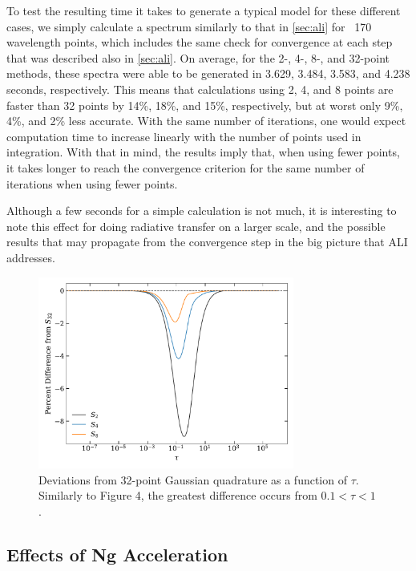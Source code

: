 \documentclass[12pt]{article}
\begin{document}
To test the resulting time it takes to generate a typical model for these different cases, we simply calculate a spectrum similarly to that in \autoref{sec:ali} for ~170 wavelength points, which includes the same check for convergence at each step that was described also in \autoref{sec:ali}. On average, for the 2-, 4-, 8-, and 32-point methods, these spectra were able to be generated in 3.629, 3.484, 3.583, and 4.238 seconds, respectively. This means that calculations using 2, 4, and 8 points are faster than 32 points by 14\%, 18\%, and 15\%, respectively, but at worst only 9\%, 4\%, and 2\% less accurate. With the same number of iterations, one would expect computation time to increase linearly with the number of points used in integration. With that in mind, the results imply that, when using fewer points, it takes longer to reach the convergence criterion for the same number of iterations when using fewer points.

Although a few seconds for a simple calculation is not much, it is interesting to note this effect for doing radiative transfer on a larger scale, and the possible results that may propagate from the convergence step in the big picture that ALI addresses.

\begin{figure}[ht]
 \centering
 \includegraphics[width=0.75\textwidth]{quadrature.pdf}
 \caption{Deviations from 32-point Gaussian quadrature as a function of $\tau$. Similarly to Figure 4, the greatest difference occurs from $0.1 < \tau < 1$. }
 \label{fig:5}
\end{figure}


\subsection{Effects of Ng Acceleration}
\end{document}
